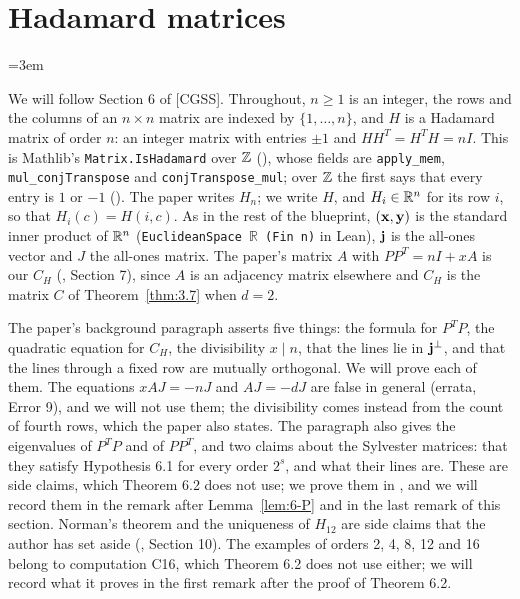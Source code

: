 \providecommand{\scl}{\opk{sc}}
\providecommand{\jp}{\Zj^\perp}
\providecommand{\agr}{\opk{ag}}

\section{Hadamard matrices}\label{sec:6}
\begingroup
\emergencystretch=3em
\raggedbottom

We will follow Section 6 of [CGSS]. Throughout, $n\geq1$ is an integer, the rows and the columns
of an $n\times n$ matrix are indexed by $\{1,\dots,n\}$, and $H$ is a Hadamard matrix of order
$n$: an integer matrix with entries $\pm1$ and $HH^T=H^TH=nI$. This is Mathlib's
\texttt{Matrix.IsHadamard} over ${\mathbb Z}$ (),
whose fields are \texttt{apply\_mem}, \texttt{mul\_conjTranspose} and
\texttt{conjTranspose\_mul}; over ${\mathbb Z}$ the first says that every entry is $1$ or $-1$
(). The paper writes $H_n$; we write $H$, and
$H_i\in{\mathbb R}^n$ for its row $i$, so that $H_i(c)=H(i,c)$. As in the rest of the blueprint,
$({\mathbf x},{\mathbf y})$ is the standard inner product of ${\mathbb R}^n$
(\texttt{EuclideanSpace \ensuremath{\mathbb R} (Fin n)} in
Lean), ${\mathbf j}$ is the all-ones vector and $J$ the all-ones matrix. The paper's matrix $A$ with
$PP^T=nI+xA$ is our $C_H$ (, Section 7), since $A$ is an adjacency matrix
elsewhere and $C_H$ is the matrix $C$ of Theorem~\ref{thm:3.7} when $d=2$.

The paper's background paragraph asserts five things: the formula for $P^TP$, the quadratic
equation for $C_H$, the divisibility $x\mid n$, that the lines lie in $\jp$, and that the lines
through a fixed row are mutually orthogonal. We will prove each of them. The equations
$xAJ=-nJ$ and $AJ=-dJ$ are false in general (errata, Error 9), and we will not use them; the
divisibility comes instead from the count of fourth rows, which the paper also states. The
paragraph also gives the eigenvalues of $P^TP$ and of $PP^T$, and two claims about the Sylvester
matrices: that they satisfy Hypothesis 6.1 for every order $2^s$, and what their lines are. These
are side claims, which Theorem 6.2 does not use; we prove them in ,
and we will record them in the remark after Lemma~\ref{lem:6-P} and in the last remark of this
section. Norman's theorem and the uniqueness of $H_{12}$ are side claims that the author has set
aside (, Section 10). The examples of orders 2, 4, 8, 12 and 16
belong to computation C16, which Theorem 6.2 does not use either; we will record what it proves
in the first remark after the proof of Theorem 6.2.

